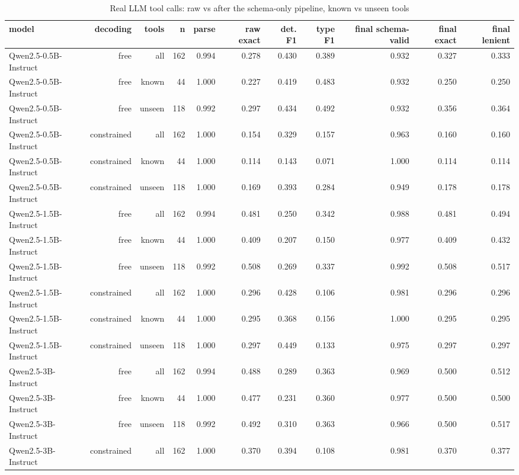 \begin{table}[t]
\centering
\caption{Real LLM tool calls: raw vs after the schema-only pipeline, known vs unseen tools}
\label{tab:cross_model}
\begin{tabular}{lrrrrrrrrrr}
\hline
model & decoding & tools & n & parse & raw exact & det. F1 & type F1 & final schema-valid & final exact & final lenient \\
\hline
Qwen2.5-0.5B-Instruct & free & all & 162 & 0.994 & 0.278 & 0.430 & 0.389 & 0.932 & 0.327 & 0.333 \\
Qwen2.5-0.5B-Instruct & free & known & 44 & 1.000 & 0.227 & 0.419 & 0.483 & 0.932 & 0.250 & 0.250 \\
Qwen2.5-0.5B-Instruct & free & unseen & 118 & 0.992 & 0.297 & 0.434 & 0.492 & 0.932 & 0.356 & 0.364 \\
Qwen2.5-0.5B-Instruct & constrained & all & 162 & 1.000 & 0.154 & 0.329 & 0.157 & 0.963 & 0.160 & 0.160 \\
Qwen2.5-0.5B-Instruct & constrained & known & 44 & 1.000 & 0.114 & 0.143 & 0.071 & 1.000 & 0.114 & 0.114 \\
Qwen2.5-0.5B-Instruct & constrained & unseen & 118 & 1.000 & 0.169 & 0.393 & 0.284 & 0.949 & 0.178 & 0.178 \\
Qwen2.5-1.5B-Instruct & free & all & 162 & 0.994 & 0.481 & 0.250 & 0.342 & 0.988 & 0.481 & 0.494 \\
Qwen2.5-1.5B-Instruct & free & known & 44 & 1.000 & 0.409 & 0.207 & 0.150 & 0.977 & 0.409 & 0.432 \\
Qwen2.5-1.5B-Instruct & free & unseen & 118 & 0.992 & 0.508 & 0.269 & 0.337 & 0.992 & 0.508 & 0.517 \\
Qwen2.5-1.5B-Instruct & constrained & all & 162 & 1.000 & 0.296 & 0.428 & 0.106 & 0.981 & 0.296 & 0.296 \\
Qwen2.5-1.5B-Instruct & constrained & known & 44 & 1.000 & 0.295 & 0.368 & 0.156 & 1.000 & 0.295 & 0.295 \\
Qwen2.5-1.5B-Instruct & constrained & unseen & 118 & 1.000 & 0.297 & 0.449 & 0.133 & 0.975 & 0.297 & 0.297 \\
Qwen2.5-3B-Instruct & free & all & 162 & 0.994 & 0.488 & 0.289 & 0.363 & 0.969 & 0.500 & 0.512 \\
Qwen2.5-3B-Instruct & free & known & 44 & 1.000 & 0.477 & 0.231 & 0.360 & 0.977 & 0.500 & 0.500 \\
Qwen2.5-3B-Instruct & free & unseen & 118 & 0.992 & 0.492 & 0.310 & 0.363 & 0.966 & 0.500 & 0.517 \\
Qwen2.5-3B-Instruct & constrained & all & 162 & 1.000 & 0.370 & 0.394 & 0.108 & 0.981 & 0.370 & 0.377 \\

\end{tabular}
\end{table}

